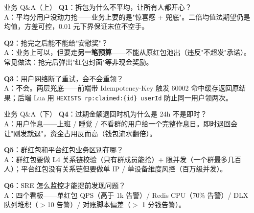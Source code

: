 \begin{frame}{业务 Q\&A（上）}
\textbf{Q1}：拆包为什么不平均，让所有人都开心？\\
\hspace{4mm}\small A：平均分用户没动力抢——业务上要的是"惊喜感 + 兜底"。二倍均值法期望仍是均值，方差可控，0.01 元下界保证末位不空手。

\vspace{2mm}
\textbf{Q2}：抢完之后能不能给"安慰奖"？\\
\hspace{4mm}\small A：业务上可以，但要走\textbf{另一笔预算}——不能从原红包池出（违反"不超发"承诺）。常见做法：抢完后弹出"红包封面"等非现金奖励。

\vspace{2mm}
\textbf{Q3}：用户网络断了重试，会不会重领？\\
\hspace{4mm}\small A：不会。两层兜底——前端带 Idempotency-Key 触发 60002 命中缓存返回原结果；后端 Lua 用 \texttt{HEXISTS rp:claimed:\{id\} userId} 防止同一用户领两次。
\end{frame}

\begin{frame}{业务 Q\&A（下）}
\textbf{Q4}：过期金额退回时机为什么是 24h 不是即时？\\
\hspace{4mm}\small A：用户作息——上班 / 睡觉 / 不看群的用户给一个完整作息日。即时退回会让"刚发就退"，资金占用反而高（钱包流水翻倍）。

\vspace{2mm}
\textbf{Q5}：群红包和平台红包业务区别在哪？\\
\hspace{4mm}\small A：群红包要做 L4 关系链校验（只有群成员能抢）+ 限并发（一个群最多几百人）；平台红包没有关系链但要做单 IP / 单设备维度风控（百万级并发）。

\vspace{2mm}
\textbf{Q6}：SRE 怎么监控才能提前发现问题？\\
\hspace{4mm}\small A：四个看板——单红包 QPS（高于 1k 告警）/ Redis CPU（70\% 告警）/ DLX 队列堆积（$>$10 告警）/ 对账脚本偏差（$>$ 1 分钱告警）。
\end{frame}

